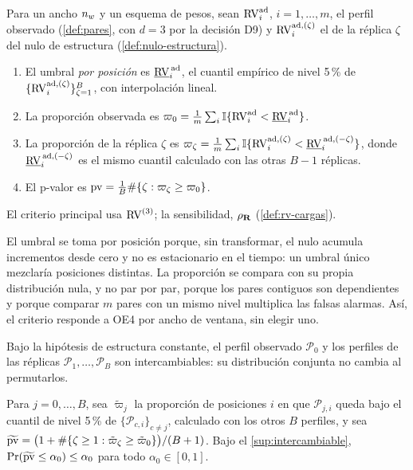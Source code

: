 \begin{definicion}[Criterio de OE4]\label{def:oe4}
Para un ancho $\nw$ y un esquema de pesos, sean $\RVad{i}$, $i=1,\dots,m$, el perfil observado
(\cref{def:pares}, con $d=3$ por la decisión D9) y $\RVadr{i}{\zeta}$ el de la réplica $\zeta$ del
nulo de estructura (\cref{def:nulo-estructura}).
\begin{enumerate}[label=(\alph*)]
  \item El umbral \emph{por posición} es $\umbralRV{i}$, el cuantil empírico de nivel 5\,\% de
    $\{\RVadr{i}{\zeta}\}_{\zeta=1}^{B}$, con interpolación lineal.
  \item La proporción observada es $\varpi_0=\frac1m\sum_i\ind\{\RVad{i}<\umbralRV{i}\}$.
  \item La proporción de la réplica $\zeta$ es
    $\varpi_\zeta=\frac1m\sum_i\ind\{\RVadr{i}{\zeta}<\umbralRVr{i}{-\zeta}\}$, donde
    $\umbralRVr{i}{-\zeta}$ es el mismo cuantil calculado con las otras $B-1$ réplicas.
  \item El p-valor es $\pval=\frac1B\#\{\zeta:\varpi_\zeta\ge\varpi_0\}$.
\end{enumerate}
El criterio principal usa $\RV^{(3)}$; la sensibilidad, $\rho_{\mR}$ (\cref{def:rv-cargas}).
\end{definicion}

El umbral se toma por posición porque, sin transformar, el nulo acumula incrementos desde cero y
no es estacionario en el tiempo: un umbral único mezclaría posiciones distintas. La proporción se
compara con su propia distribución nula, y no par por par, porque los pares contiguos son
dependientes y porque comparar $m$ pares con un mismo nivel multiplica las falsas alarmas. Así, el
criterio responde a OE4 por ancho de ventana, sin elegir uno.

\begin{supuesto}\label{sup:intercambiable}
Bajo la hipótesis de estructura constante, el perfil observado $\mathcal{P}_0$ y los perfiles de las réplicas
$\mathcal{P}_1,\dots,\mathcal{P}_B$ son intercambiables: su distribución conjunta no cambia al permutarlos.
\end{supuesto}

\begin{proposicion}\label{prop:oe4}
Para $j=0,\dots,B$, sea $\tilde\varpi_j$ la proporción de posiciones $i$ en que $\mathcal{P}_{j,i}$ queda bajo el
cuantil de nivel 5\,\% de $\{\mathcal{P}_{c,i}\}_{c\ne j}$, calculado con los otros $B$ perfiles, y sea
$\widetilde{\pval}=\bigl(1+\#\{\zeta\ge1:\tilde\varpi_\zeta\ge\tilde\varpi_0\}\bigr)/(B+1)$. Bajo el \cref{sup:intercambiable},
$\Pr(\widetilde{\pval}\le\alpha_0)\le\alpha_0$ para todo $\alpha_0\in[0,1]$.
\end{proposicion}

